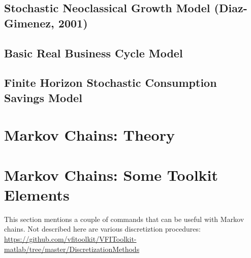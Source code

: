 \documentclass[11pt,fleqn]{article}
\begin{document}
\subsection{Stochastic Neoclassical Growth Model (Diaz-Gimenez, 2001)} \label{example:StochasticNeoclassicalGrowth}

\newpage

\subsection{Basic Real Business Cycle Model} \label{example:BasicRBC}

\newpage

\subsection{Finite Horizon Stochastic Consumption Savings Model} \label{example:FHorzStochConsSavings}

\newpage




\newpage

\appendix

\section{Markov Chains: Theory} \label{appendix:MarkovChains}

\newpage

\section{Markov Chains: Some Toolkit Elements}
This section mentions a couple of commands that can be useful with Markov chains. Not described here are various discretiztion procedures: \href{https://github.com/vfitoolkit/VFIToolkit-matlab/tree/master/DiscretizationMethods}{https://github.com/vfitoolkit/VFIToolkit-matlab/tree/master/DiscretizationMethods}
\end{document}
